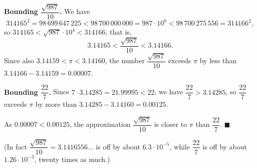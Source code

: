 \textbf{Bounding $\dfrac{\sqrt{987}}{10}$.} We have
\[
314165^2=98\,699\,647\,225<98\,700\,000\,000=987\cdot10^{8}<98\,700\,275\,556=314166^2 ,
\]
so $314165<\sqrt{987}\cdot10^4<314166$, that is,
\[
3.14165<\dfrac{\sqrt{987}}{10}<3.14166 .
\]
Since also $3.14159<\pi<3.14160$, the number $\dfrac{\sqrt{987}}{10}$ exceeds $\pi$ by less than $3.14166-3.14159=0.00007$.

\textbf{Bounding $\dfrac{22}{7}$.} Since $7\cdot3.14285=21.99995<22$, we have $\dfrac{22}{7}>3.14285$, so $\dfrac{22}{7}$ exceeds $\pi$ by more than $3.14285-3.14160=0.00125$.

As $0.00007<0.00125$, the approximation $\dfrac{\sqrt{987}}{10}$ is closer to $\pi$ than $\dfrac{22}{7}$. $\blacksquare$

(In fact $\dfrac{\sqrt{987}}{10}=3.1416556\ldots$ is off by about $6.3\cdot10^{-5}$, while $\dfrac{22}{7}$ is off by about $1.26\cdot10^{-3}$, twenty times as much.)
